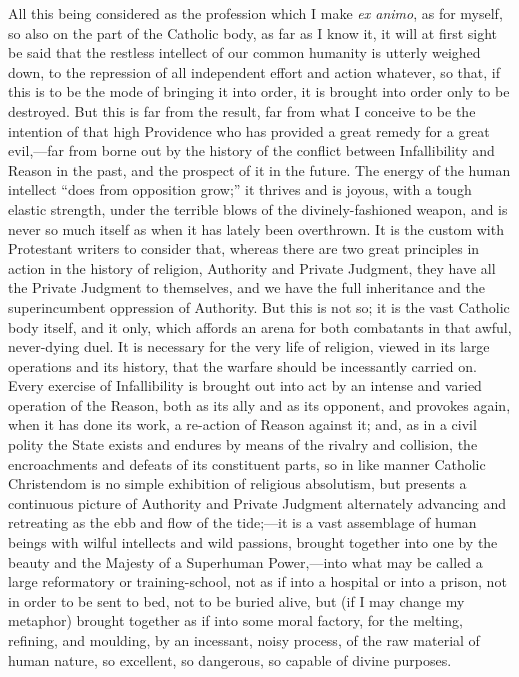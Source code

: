 All this being considered as the profession which I
make \emph{ex animo}, as for myself, so also on the
part of the Catholic body, as far as I know it, it will at first sight
be said that the restless intellect of our common humanity is utterly
weighed down, to the repression of all independent effort and
action whatever, so that, if this is to be the mode of bringing it into
order, it is brought into order only to be destroyed. But this is far
from the result, far from what I conceive to be the intention of that
high Providence who has provided a great remedy for a great evil,—far
from borne out by the history of the conflict between Infallibility and
Reason in the past, and the prospect of it in the future. The energy of
the human intellect ``does from opposition grow;'' it thrives
and is joyous, with a tough elastic strength, under the terrible blows
of the divinely-fashioned weapon, and is never so much itself as when it
has lately been overthrown. It is the custom with Protestant writers to
consider that, whereas there are two great principles in action in the
history of religion, Authority and Private Judgment, they have all the
Private Judgment to themselves, and we have the full inheritance and the
superincumbent oppression of Authority. But this is not so; it is the
vast Catholic body itself, and it only, which affords an arena for both
combatants in that awful, never-dying duel. It is necessary for
the very life of religion, viewed in its large operations and its
history, that the warfare should be incessantly carried on. Every
exercise of Infallibility is brought out into act by an intense and
varied operation of the Reason, both as its ally and as its opponent, and
provokes again, when it has done its work, a re-action of Reason
against it; and, as in a civil polity the State exists and endures by
means of the rivalry and collision, the encroachments and defeats of its
constituent parts, so in like manner Catholic Christendom is no simple
exhibition of religious absolutism, but presents a continuous
picture of Authority and Private Judgment alternately advancing and
retreating as the ebb and flow of the tide;—it is a vast assemblage of
human beings with wilful intellects and wild passions, brought together
into one by the beauty and the Majesty of a Superhuman Power,—into
what may be called a large reformatory or training-school, not as if
into a hospital or into a prison, not in order to be sent to
bed, not to be buried alive, but (if I may change my metaphor)
brought together as if into some moral factory, for the melting,
refining, and moulding, by an incessant,
noisy process, of the raw material of human nature, so excellent, so dangerous, so
capable of divine purposes.

